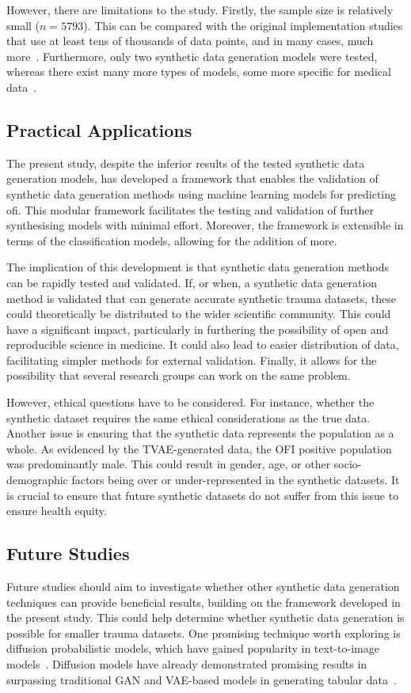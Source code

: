 \documentclass[12pt, a4paper]{article}
\begin{document}
However, there are limitations to the study. Firstly, the sample size is relatively small ($n = 5793$). This can be
compared with the original implementation studies that use at least tens of thousands of data points, and in many
cases, much more~\cite{xu_modeling_2019,karras_training_2020}. Furthermore, only two synthetic data generation models
were tested, whereas there exist many more types of models, some more specific for medical
data~\cite{hernandez_synthetic_2022}.

\subsection{Practical Applications}
The present study, despite the inferior results of the tested synthetic data generation models, has developed a
framework that enables the validation of synthetic data generation methods using machine learning models for predicting
\acrshort{ofi}. This modular framework facilitates the testing and validation of further synthesising models with
minimal effort. Moreover, the framework is extensible in terms of the classification models, allowing for the addition
of more.

The implication of this development is that synthetic data generation methods can be rapidly tested and validated. If,
or when, a synthetic data generation method is validated that can generate accurate synthetic trauma datasets, these
could theoretically be distributed to the wider scientific community. This could have a significant impact,
particularly in furthering the possibility of open and reproducible science in medicine. It could also lead to easier
distribution of data, facilitating simpler methods for external validation. Finally, it allows for the possibility that
several research groups can work on the same problem.

However, ethical questions have to be considered. For instance, whether the synthetic dataset requires the same ethical
considerations as the true data. Another issue is ensuring that the synthetic data represents the population as a
whole. As evidenced by the TVAE-generated data, the OFI positive population was predominantly male. This could result
in gender, age, or other socio-demographic factors being over or under-represented in the synthetic datasets. It is
crucial to ensure that future synthetic datasets do not suffer from this issue to ensure health equity.

\subsection{Future Studies}
Future studies should aim to investigate whether other synthetic data generation techniques can provide beneficial
results, building on the framework developed in the present study. This could help determine whether synthetic data
generation is possible for smaller trauma datasets. One promising technique worth exploring is diffusion probabilistic
models, which have gained popularity in text-to-image models~\cite{rombach_high-resolution_2022,
	ramesh_hierarchical_2022}. Diffusion models have already demonstrated promising results in surpassing traditional GAN
and VAE-based models in generating tabular data~\cite{kotelnikov_tabddpm_2022}.
\end{document}
